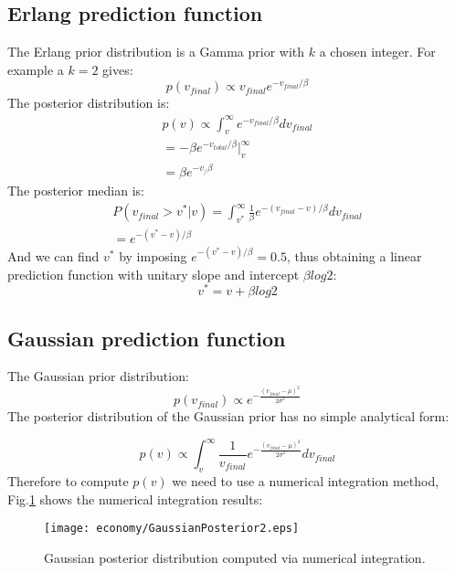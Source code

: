 \subsection{Erlang prediction function}
The Erlang prior distribution is a Gamma prior with $k$ a chosen integer.
For example a $k=2$ gives:
\begin{equation}
 p(v_{final})\varpropto v_{final} e^{-v_{final}/\beta}
\end{equation}
The posterior distribution is:
\begin{eqnarray}
p(v) \varpropto \int^{\infty}_{v} e^{-v_{final}/\beta} dv_{final}\\
=-\beta e^{-v_{total}/\beta} \rvert^{\infty}_{v}\\
=\beta e^{-v_/\beta}
\end{eqnarray}
The posterior median is:
\begin{eqnarray}
P(v_{final}>v^*|v)=\int_{v^*}^{\infty} \frac{1}{\beta} e^{-(v_{final}-v)/\beta} dv_{final}\\
=e^{-(v^*-v)/\beta}
\end{eqnarray}
And we can find $v^*$ by imposing $e^{-(v^*-v)/\beta}=0.5$, thus obtaining a linear
 prediction function with unitary slope and intercept $\beta log2$:
\begin{equation}
 v^*=v+\beta log2
 \label{eq:ErlangPred}
\end{equation}
\subsection{Gaussian prediction function}
The Gaussian prior distribution:
\begin{equation}
 p(v_{final})\varpropto e^{-\frac{(v_{final}-\mu)^2}{2\sigma^2}}
\end{equation}
The posterior distribution of the Gaussian prior has no simple analytical form:

\begin{equation}
 p(v)\varpropto \int^{\infty}_{v} \frac{1}{v_{final}} e^{-\frac{(v_{final}-\mu)^2}{2\sigma^2}} dv_{final}
\end{equation}
Therefore to compute $p(v)$ we need to use a numerical integration method,
Fig.\ref{GaussianNumericalPosterior} shows the numerical integration results:

\begin{figure}[!htbp]
	\begin{center}
	\texttt{[image: economy/GaussianPosterior2.eps]}
	\end{center}
	\caption[Gaussian posterior distribution]{Gaussian posterior distribution computed via numerical integration.
	}
	\label{GaussianNumericalPosterior}
\end{figure}

